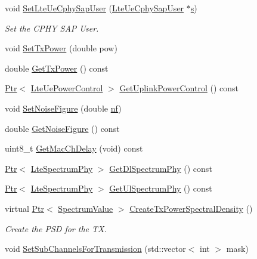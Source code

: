 \begin{DoxyCompactItemize}
void \hyperlink{classns3_1_1LteUePhy_ab4674f382c675cebaac94e0270ecc8be}{Set\+Lte\+Ue\+Cphy\+Sap\+User} (\hyperlink{classns3_1_1LteUeCphySapUser}{Lte\+Ue\+Cphy\+Sap\+User} $\ast$\hyperlink{generate__test__data__lte__sinr_8m_ad83eeb3a142285d1243a08c6b7026df8}{s})
\begin{DoxyCompactList}\small\item\em Set the C\+P\+HY S\+AP User. \end{DoxyCompactList}\item 
void \hyperlink{classns3_1_1LteUePhy_ae3dc19cc90247e3ab5baaa0e32a8b794}{Set\+Tx\+Power} (double pow)
\item 
double \hyperlink{classns3_1_1LteUePhy_a632bc541f02345b3df0791c74f055ff8}{Get\+Tx\+Power} () const 
\item 
\hyperlink{classns3_1_1Ptr}{Ptr}$<$ \hyperlink{classns3_1_1LteUePowerControl}{Lte\+Ue\+Power\+Control} $>$ \hyperlink{classns3_1_1LteUePhy_a386b038c79252c3fe8408e68279fa88b}{Get\+Uplink\+Power\+Control} () const 
\item 
void \hyperlink{classns3_1_1LteUePhy_aab1ca9ca90125fc66665cefe31adea40}{Set\+Noise\+Figure} (double \hyperlink{lte__link__budget__x2__handover__measures_8m_a9cd8534b44434622d5c8bbb1e3f3ff62}{nf})
\item 
double \hyperlink{classns3_1_1LteUePhy_acccb4100bfdfa2a660eecc438817a094}{Get\+Noise\+Figure} () const 
\item 
uint8\+\_\+t \hyperlink{classns3_1_1LteUePhy_a9336ccf613857b68ad2670f3aade12f8}{Get\+Mac\+Ch\+Delay} (void) const 
\item 
\hyperlink{classns3_1_1Ptr}{Ptr}$<$ \hyperlink{classns3_1_1LteSpectrumPhy}{Lte\+Spectrum\+Phy} $>$ \hyperlink{classns3_1_1LteUePhy_a37b112f6bd9ebc385288eaf047169ee5}{Get\+Dl\+Spectrum\+Phy} () const 
\item 
\hyperlink{classns3_1_1Ptr}{Ptr}$<$ \hyperlink{classns3_1_1LteSpectrumPhy}{Lte\+Spectrum\+Phy} $>$ \hyperlink{classns3_1_1LteUePhy_adc5d954006e18da9dc98e633c8857b34}{Get\+Ul\+Spectrum\+Phy} () const 
\item 
virtual \hyperlink{classns3_1_1Ptr}{Ptr}$<$ \hyperlink{classns3_1_1SpectrumValue}{Spectrum\+Value} $>$ \hyperlink{classns3_1_1LteUePhy_a617e7e504fb2364348aecb56b3aeb3b7}{Create\+Tx\+Power\+Spectral\+Density} ()
\begin{DoxyCompactList}\small\item\em Create the P\+SD for the TX. \end{DoxyCompactList}\item 
void \hyperlink{classns3_1_1LteUePhy_a0b004ef45d225a8cf75647db08aeab9b}{Set\+Sub\+Channels\+For\+Transmission} (std\+::vector$<$ int $>$ mask)

\end{DoxyCompactItemize}
